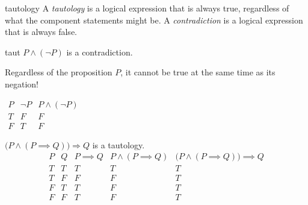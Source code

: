 
\begin{defn}{}{tautology}
	A \emph{tautology} is a logical expression that is always true, regardless of what the component statements might be.\smallbreak
	A \emph{contradiction} is a logical expression that is always false.
\end{defn}


\begin{examples}{}{taut}
\exstart $P\wedge(\neg P)$ is a contradiction.
	
\begin{enumerate}\setcounter{enumi}{1}
  \begin{minipage}[t]{0.65\linewidth}\vspace{-8pt}
  	\item[] Regardless of the proposition $P$, it cannot be true at the same time as its negation!
  \end{minipage}
  \hfill
  \begin{minipage}[t]{0.29\linewidth}\vspace{-27pt}
	$\begin{array}{cc|c}
	P & \neg P & P\wedge(\neg P)\\\hline
	T & F & F\\
	F & T & F
	\end{array}$
  \end{minipage}\par
  
	\item\label{ex:taut2} $\bigl(P\wedge(P\implies Q)\bigr)\Longrightarrow Q$ is a tautology.%
	\[\begin{array}{cc||c|c||c}
	P & Q & P\implies Q & P\wedge(P\implies Q) & \bigl(P\wedge(P\implies Q)\bigr)\implies Q\\\hline
	T & T & T & T& T\\
	T & F & F & F& T\\
	F & T & T & F& T\\
	F & F & T & F& T
	\end{array}\]
	\end{enumerate}
\end{examples}

